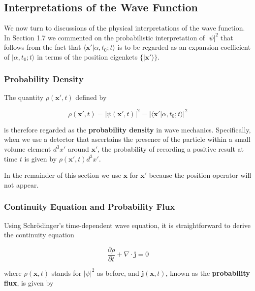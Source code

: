 \documentclass[11pt,a4paper]{article}
\begin{document}
\subsection{Interpretations of the Wave Function}

We now turn to discussions of the physical interpretations of the wave function. In Section 1.7 we commented on the probabilistic interpretation of $|\psi|^2$ that follows from the fact that $\langle \mathbf{x}'|\alpha, t_0; t\rangle$ is to be regarded as an expansion coefficient of $|\alpha, t_0; t\rangle$ in terms of the position eigenkets $\{|\mathbf{x}'\rangle\}$.

\subsubsection{Probability Density}

The quantity $\rho(\mathbf{x}', t)$ defined by

\begin{equation}
\boxed{\rho(\mathbf{x}', t) = |\psi(\mathbf{x}', t)|^2 = |\langle \mathbf{x}'|\alpha, t_0; t\rangle|^2}
\tag{2.189}
\end{equation}

is therefore regarded as the \textbf{probability density} in wave mechanics. Specifically, when we use a detector that ascertains the presence of the particle within a small volume element $d^3x'$ around $\mathbf{x}'$, the probability of recording a positive result at time $t$ is given by $\rho(\mathbf{x}', t)d^3x'$.

In the remainder of this section we use $\mathbf{x}$ for $\mathbf{x}'$ because the position operator will not appear.

\subsubsection{Continuity Equation and Probability Flux}

Using Schrödinger's time-dependent wave equation, it is straightforward to derive the continuity equation

\begin{equation}
\boxed{\frac{\partial \rho}{\partial t} + \nabla \cdot \mathbf{j} = 0}
\tag{2.190}
\end{equation}

where $\rho(\mathbf{x}, t)$ stands for $|\psi|^2$ as before, and $\mathbf{j}(\mathbf{x}, t)$, known as the \textbf{probability flux}, is given by
\end{document}
